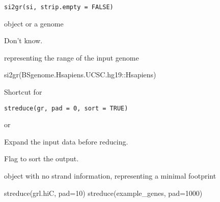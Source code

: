 \documentclass[a4paper]{book}
\begin{document}
%
\begin{Usage}
\begin{verbatim}
si2gr(si, strip.empty = FALSE)
\end{verbatim}
\end{Usage}
%
\begin{Arguments}
\begin{ldescription}
\item[\code{si}]  object or a  genome

\item[\code{strip.empty}] Don't know. \code{[FALSE]}
\end{ldescription}
\end{Arguments}
%
\begin{Value}
 representing the range of the input genome
\end{Value}
%
\begin{Examples}
\begin{ExampleCode}
si2gr(BSgenome.Hsapiens.UCSC.hg19::Hsapiens)
\end{ExampleCode}
\end{Examples}
%
\begin{Description}\relax
Shortcut for 
\end{Description}
%
\begin{Usage}
\begin{verbatim}
streduce(gr, pad = 0, sort = TRUE)
\end{verbatim}
\end{Usage}
%
\begin{Arguments}
\begin{ldescription}
\item[\code{gr}]  or 

\item[\code{pad}] Expand the input data before reducing. \code{[0]}

\item[\code{sort}] Flag to sort the output. \code{[TRUE]}
\end{ldescription}
\end{Arguments}
%
\begin{Value}
 object with no strand information, representing a minimal footprint
\end{Value}
%
\begin{Examples}
\begin{ExampleCode}
streduce(grl.hiC, pad=10)
streduce(example_genes, pad=1000)
\end{ExampleCode}
\end{Examples}
\end{document}
